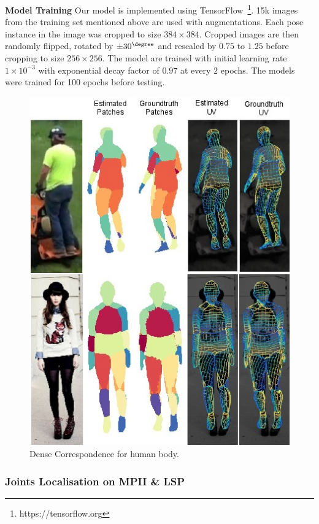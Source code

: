 \noindent\textbf{Model Training} Our model is implemented using TensorFlow~\footnote{https://tensorflow.org}. 15k images from the training set mentioned above are used with augmentations. Each pose instance in the image was cropped to size $384 \times 384$. Cropped images are then randomly flipped, rotated by $\pm 30^{\degree} $ and rescaled by $0.75$ to $1.25$ before cropping to size $256 \times 256$. The model are trained with initial learning rate $1\times10^{-3}$ with exponential decay factor of $0.97$ at every $2$ epochs. The models were trained for 100 epochs before testing.

\begin{figure}[!h]
\centering
\includegraphics[width=0.89\linewidth]{Figures/DenseReg_Person-2}
\caption{Dense Correspondence for human body.}
\vspace{-0.25cm}
\label{fig:DenseReg_Human}
\end{figure}

\label{sec:pred_mpii_lsp}
\subsubsection{Joints Localisation on MPII \& LSP}

